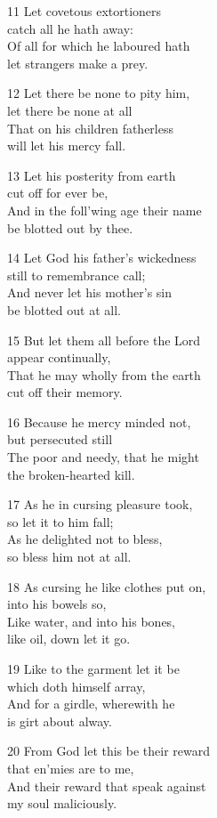 11 Let covetous extortioners\\
catch all he hath away:\\
Of all for which he laboured hath\\
let strangers make a prey.

12 Let there be none to pity him,\\
let there be none at all\\
That on his children fatherless\\
will let his mercy fall.

13 Let his posterity from earth\\
cut off for ever be,\\
And in the foll’wing age their name\\
be blotted out by thee.

14 Let God his father’s wickedness\\
still to remembrance call;\\
And never let his mother’s sin\\
be blotted out at all.

15 But let them all before the Lord\\
appear continually,\\
That he may wholly from the earth\\
cut off their memory.

16 Because he mercy minded not,\\
but persecuted still\\
The poor and needy, that he might\\
the broken-hearted kill.

17 As he in cursing pleasure took,\\
so let it to him fall;\\
As he delighted not to bless,\\
so bless him not at all.

18 As cursing he like clothes put on,\\
into his bowels so,\\
Like water, and into his bones,\\
like oil, down let it go.

19 Like to the garment let it be\\
which doth himself array,\\
And for a girdle, wherewith he\\
is girt about alway.

20 From God let this be their reward\\
that en’mies are to me,\\
And their reward that speak against\\
my soul maliciously.

